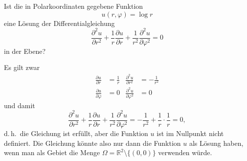Ist die in Polarkoordinaten gegebene Funktion
\[
u(r,\varphi)=\log r
\]
eine Lösung der Differentialgleichung
\[
\frac{\partial^2u}{\partial r^2} +\frac1r\frac{\partial u}{\partial r}+\frac1{r^2}\frac{\partial^2 u}{\partial \varphi^2}=0
\]
in der Ebene?

\begin{loesung}
Es gilt zwar
\begin{align*}
\frac{\partial u}{\partial r}
&=
\frac1r
&
\frac{\partial^2 u}{\partial r^2}
&=
-\frac1{r^2}
\\
\frac{\partial u}{\partial \varphi}
&=
0
&
\frac{\partial^2 u}{\partial \varphi^2}
&=
0
\end{align*}
und damit
\[
\frac{\partial^2u}{\partial r^2}
+\frac1r\frac{\partial u}{\partial r}
+\frac1{r^2}\frac{\partial^2 u}{\partial \varphi^2}
=
-\frac1{r^2}
+\frac1r\cdot\frac1r=0,
\]
d.\,h.~die Gleichung ist erfüllt, aber die Funktion $u$ ist im Nullpunkt
nicht definiert. Die Gleichung könnte also nur dann die Funktion $u$
als Lösung haben, wenn man als Gebiet die Menge
$\Omega=\mathbb R^2\setminus\{(0,0)\}$ verwenden würde.
\end{loesung}
